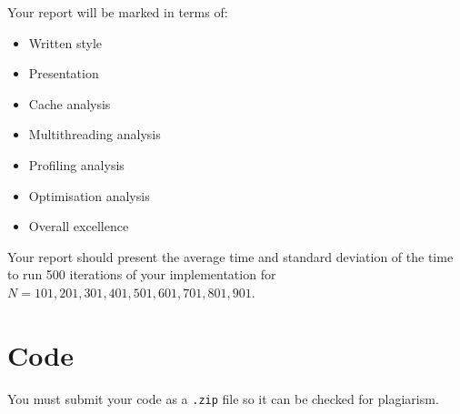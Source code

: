 \documentclass[a4paper,11pt]{article}
\newcommand{\code}[1]{\texttt{#1}}
\begin{document}

Your report will be marked in terms of:
%
\begin{itemize}
\item Written style
\item Presentation
\item Cache analysis
\item Multithreading analysis
\item Profiling analysis 
\item Optimisation analysis
\item Overall excellence  
\end{itemize}

Your report should present the average time and standard deviation of
the time to run 500 iterations of your implementation for $N=101, 201,
301, 401, 501, 601, 701, 801, 901$.



\section{Code}

You must submit your code as a \code{.zip} file so it can be checked
for plagiarism.
\end{document}
